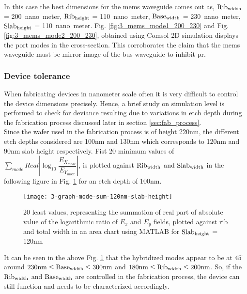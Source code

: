 \documentclass[../report.tex]{subfiles}
\begin{document}
In this case the best dimensions for the \gls{mems} waveguide comes out as, $\mathrm{Rib_{width}}$ = \SI{200}{nano meter}, $\mathrm{Rib_{height}}$ = \SI{110}{nano meter}, $\mathrm{Base_{width}}$ = \SI{230}{nano meter}, $\mathrm{Slab_{height}}$ = \SI{110}{nano meter}. Fig. \ref{fig:3_mems_mode1_200_230} and Fig. \ref{fig:3_mems_mode2_200_230}, obtained using Comsol 2D simulation displays the port modes in the cross-section. This corroborates the claim that the \gls{mems} waveguide must be mirror image of the bus waveguide to inhibit \gls{pr}.

\subsubsection{Device tolerance}
When fabricating devices in nanometer scale often it is very difficult to control the device dimensions precisely. Hence, a brief study on simulation level is performed to check for deviance resulting due to variations in etch depth during the fabrication process discussed later in section \ref{sec:fab_process}.\\  

Since the wafer used in the fabrication process is of height 220nm, the different etch depths considered are 100nm and 130nm which corresponds to 120nm and 90nm slab height respectively. Fist 20 minimum values of $\sum _{mode}Real\left| \log _{10}\dfrac {E_{X_{mode}}} {E_{Y_{mode}}}\right|$, is plotted against $\mathrm{Rib_{width}}$ and $\mathrm{Slab_{width}}$ in the following figure in Fig. \ref{fig:3_graph_mode_sum_120nm_slab_height} for an etch depth of 100nm. 

\begin{figure}[H] %
	\centering
	\texttt{[image: 3-graph-mode-sum-120nm-slab-height]}
	\caption{20 least values, representing the summation of real part of absolute value of the logarithmic ratio of $E_x$ and $E_y$ fields, plotted against rib and total width in an area chart using MATLAB for $\mathrm{Slab_{height}}$ = 120nm}
	\label{fig:3_graph_mode_sum_120nm_slab_height}
\end{figure}
\noindent It can be seen in the above Fig. \ref{fig:3_graph_mode_sum_120nm_slab_height} that the hybridized modes appear to be at $45^{\circ}$ around $\mathrm{230nm \leq Base_{width} \leq 300nm}$ and $\mathrm{180nm \leq Rib_{width} \leq 200nm}$. So, if the $\mathrm{Rib_{width}}$ and $\mathrm{Base_{width}}$ are controlled in the fabrication process, the device can still function and needs to be characterized accordingly.\\
\end{document}
